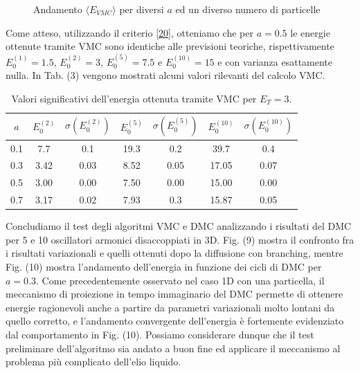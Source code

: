 \documentclass[11pt,a4paper]{article}
\begin{document}
\begin{figure}[!h]
\hspace{3mm}
\caption{Andamento $\langle E_{VMC}\rangle$ per diversi $a$ ed un diverso numero di particelle}
\end{figure}
Come atteso, utilizzando il criterio \eqref{20}, otteniamo che per $a=0.5$ le energie ottenute tramite VMC sono identiche alle previsioni teoriche, rispettivamente $E_0^{(1)}=1.5$, $E_0^{(2)}=3$, $E_0^{(5)}=7.5$ e $E_0^{(10)}=15$ e con varianza esattamente nulla. In Tab. (3) vengono mostrati alcuni valori rilevanti del calcolo VMC.
\begin{table}[!h]
\centering
\begin{tabular}{|c|c|c|c|c|c|c|}
\hline
$a$ & $E_0^{(2)}$ & $\sigma(E_0^{(2)})$ & $E_0^{(5)}$ & $\sigma(E_0^{(5)})$ & $E_0^{(10)}$ & $\sigma(E_0^{(10)})$ \\ \hline
0.1 &	7.7 & 0.1 & 19.3 & 0.2 & 39.7 & 0.4 \\ \hline
0.3  & 3.42 & 0.03 & 8.52 & 0.05 & 17.05 & 0.07 \\ \hline
0.5 	& 3.00 	 & 0.00 & 7.50 & 0.00 & 15.00 & 0.00 \\ \hline
0.7 	& 3.17 & 0.02 & 7.93 & 0.3 & 15.87 & 0.05 \\ \hline
\end{tabular}
\caption{Valori significativi dell'energia ottenuta tramite VMC per $E_T=3.$}
\end{table}
Concludiamo il test degli algoritmi VMC e DMC analizzando i risultati del DMC per 5 e 10 oscillatori armonici disaccoppiati in 3D. Fig. (9) mostra il confronto fra i risultati variazionali e quelli ottenuti dopo la diffusione con branching, mentre Fig. (10) mostra l'andamento dell'energia in funzione dei cicli di DMC per $a=0.3$. Come precedentemente osservato nel caso 1D con una particella, il meccanismo di proiezione in tempo immaginario del DMC permette di ottenere energie ragionevoli anche a partire da parametri variazionali molto lontani da quello corretto, e l'andamento convergente dell'energia è fortemente evidenziato dal comportamento in Fig. (10). Possiamo considerare dunque che il test preliminare dell'algoritmo sia andato a buon fine ed applicare il meccanismo al problema più complicato dell'elio liquido. 
\end{document}

